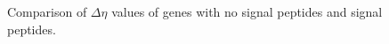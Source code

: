 \documentclass[11pt]{labbook}
\begin{document}
\begin{figure}
\caption{Comparison of $\Delta\eta$ values of genes with no signal peptides and signal peptides.}
\end{figure}
\end{document}
